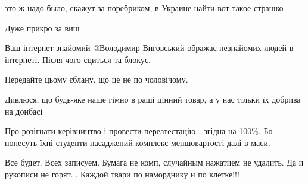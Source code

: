 \begin{itemize}
это ж надо было, скажут за поребриком, в Украине найти вот такое страшко

 
Дуже прикро за виш

 

Ваш інтернет знайомий @Володимир Виговський ображає незнайомих людей в
інтернеті. Після чого сциться та блокує.

Передайте цьому єблану, що це не по чоловічому.

 
Дивлюся, що будь-яке наше гімно в раші цінний товар, а у нас тільки їх добрива на донбасі

 
Про розігнати керівництво і провести переатестацію - згідна на 100\%. Бо понесуть їхні студенти насаджений комплекс меншовартості далі в маси.

 
Все будет. Всех записуем. Бумага не комп, случайным нажатием не удалить. Да и
рукописи не горят... Каждой твари по наморднику и по клетке!!!

 

\end{itemize}
